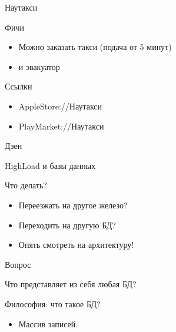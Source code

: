 \documentclass[aspectratio=169]{beamer}
\begin{document}
\begin{frame}{Наутакси}
    \begin{block}{Фичи}
        \begin{itemize}
            \item Можно заказать такси (подача от 5 минут)
            \item и эвакуатор
        \end{itemize}
    \end{block}

    \begin{block}{Ссылки}
        \begin{itemize}
            \item AppleStore://Наутакси
            \item PlayMarket://Наутакси
        \end{itemize}
    \end{block}

\end{frame}

\begin{frame}
    \begin{center}
        {\huge Дзен}
    \end{center}
\end{frame}


\begin{frame}{HighLoad и базы данных}
    \begin{block}{Что делать?}
        \begin{itemize}
            \item Переезжать на другое железо?
            \item Переходить на другую БД?
        \end{itemize}
        \par
        \begin{itemize}
            \pause\item Опять смотреть на архитектуру!
        \end{itemize}
    \end{block}
\end{frame}



\begin{frame}{Вопрос}
    \begin{center}
        {\huge Что представляет из себя любая БД?}
    \end{center}
\end{frame}

\begin{frame}{Философия: что такое БД?}
    \begin{itemize}
        \pause\item Массив записей.
    \end{itemize}
\end{frame}
\end{document}
